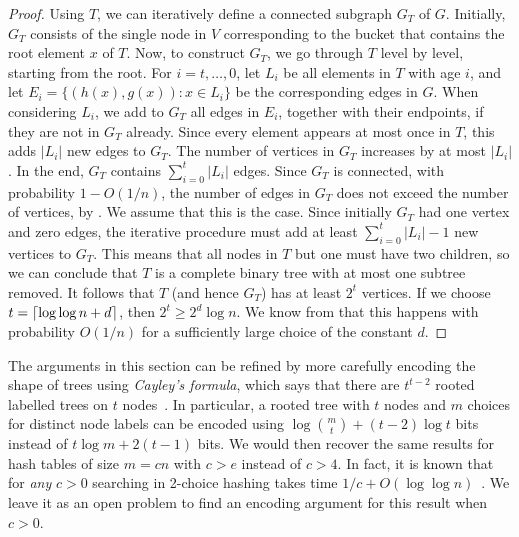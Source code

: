 \documentclass{patmorin}
\begin{document}
\begin{proof}
  Using $T$, we can iteratively define a connected subgraph $G_T$ of $G$.
  Initially, $G_T$ consists of the single node in $V$ corresponding
  to the bucket that contains the root element $x$ of $T$.
  Now, to construct $G_T$, we go through $T$ level by level, 
  starting from the root.
  For $i =  t,\dots, 0$, let
  $L_i$ be all elements in $T$ with age $i$, and let
  $E_i = \{(h(x), g(x)) : x \in L_i\}$ be the corresponding
  edges in $G$.
  When considering $L_i$, we add 
  to $G_T$ all edges in $E_i$, together with their endpoints,
  if they are not in $G_T$ already.
  Since every element appears at most once in $T$, this
  adds $|L_i|$ new edges to $G_T$. The number of vertices in $G_T$
  increases by at most $|L_i|$. In the end, $G_T$ contains
  $\sum_{i = 0}^{t} |L_i|$ edges. Since $G_T$ is connected, 
  with probability $1 - O(1/n)$, the number of edges in $G_T$ does not 
  exceed the number of vertices, by . 
  We assume that this is the case.
  Since initially $G_T$ had 
  one vertex and zero edges, the iterative procedure must add
  at least $\sum_{i = 0}^{t} |L_i| - 1$ new vertices to $G_T$.
  This means that all nodes in $T$ but one must
  have two children, so we can conclude that $T$ is a
  complete binary tree with at most one subtree removed. It follows
  that $T$ (and hence $G_T$) has at least $2^{t}$ vertices.
  If we choose $t = {\lceil \log \log n + d \rceil}$, then 
  $2^t \geq 2^d \log n$. 
  We know from
   that this 
  happens with probability $O(1/n)$
  for a sufficiently large choice of the constant $d$.
\end{proof}

\begin{rem}
  The arguments in this section can be refined by more carefully
  encoding the shape of trees using \emph{Cayley's formula}, which says 
  that
  there are $t^{t - 2}$ rooted labelled trees on $t$
  nodes~\cite{cayley:theorem}. In particular, a rooted tree with $t$
  nodes and $m$ choices for distinct node labels can be encoded using
  $\log \binom{m}{t} + (t - 2) \log t$ bits instead of
  $t \log m + 2(t - 1)$ bits. We would then recover the same results
  for hash tables of size $m = cn$ with $c > e$ instead of $c > 4$. In
  fact, it is known that for \emph{any}
  $c > 0$ searching in 2-choice hashing takes time 
  $1/c + O(\log \log n)$~\cite{berenbrink:densehashing}. We leave it as an
  open problem to find an encoding argument for this result when
  $c > 0$.
\end{rem}
\end{document}
